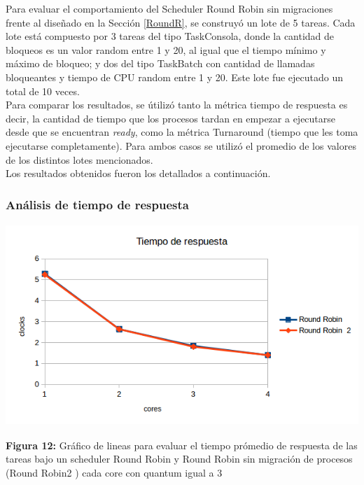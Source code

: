 \documentclass[a4paper]{article}
\begin{document}
Para evaluar el comportamiento del Scheduler Round Robin sin migraciones frente al diseñado en la Sección \ref{RoundR}, se construy\'o un lote de 5 tareas. Cada lote est\'a compuesto por 3 tareas del tipo TaskConsola, donde la cantidad de bloqueos es un valor random entre 1 y 20, al igual que el tiempo mínimo y máximo de bloqueo; y dos del tipo TaskBatch con cantidad de llamadas bloqueantes y tiempo de CPU random entre 1 y 20. Este lote fue ejecutado un total de 10 veces.\\


Para comparar los resultados, se útilizó tanto la métrica tiempo de respuesta es decir, la cantidad de tiempo que los procesos tardan en empezar a ejecutarse desde que se encuentran \emph{ready}, como la m\'etrica Turnaround (tiempo que les toma ejecutarse completamente). Para ambos casos se utilizó el promedio de los valores de los distintos lotes mencionados. \\

\newpage
Los resultados obtenidos fueron los detallados a continuaci\'on. 


\subsubsection*{An\'alisis de tiempo de respuesta}
\includegraphics[width=\textwidth,height=3.0in,keepaspectratio
]{imagenes/ej8/tr.png} \\
\begin {flushleft}
\textbf{Figura 12:} Gráfico de lineas para evaluar el tiempo prómedio de respuesta de las tareas bajo un scheduler Round Robin y Round Robin sin migración de procesos (Round Robin2 ) cada core con quantum igual a 3
\end{flushleft}	
\end{document}
